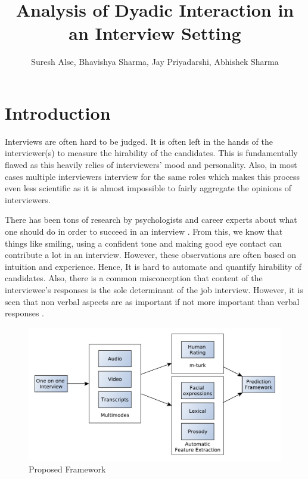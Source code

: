 \documentclass[11pt]{article}
\begin{document}
\title{Analysis of Dyadic Interaction in an Interview Setting}

\author{Suresh Alse, Bhavishya Sharma, Jay Priyadarshi, Abhishek Sharma}

\maketitle




\nocite{*}
\section{Introduction}
Interviews are often hard to be judged. It is often left in the hands of the interviewer(s) to measure the hirability of the candidates. This is fundamentally flawed as this heavily relies of interviewers' mood and personality. Also, in most cases multiple interviewers interview for the same roles which makes this process even less scientific as it is almost impossible to fairly aggregate the opinions of interviewers.

There has been tons of research by psychologists and career experts about what one should do in order to succeed in an interview \cite{huffcutt2001identification}. From this, we know that things like smiling, using a confident tone and making good eye contact can contribute a lot in an interview. However, these observations are often based on intuition and experience. Hence, It is hard to automate and quantify hirability of candidates. Also, there is a common misconception that content of the interviewee's responses is the sole determinant of the job interview. However, it is seen that non verbal aspects are as important if not more important than verbal responses \cite{mehrabian1971silent}.

\begin{figure}[h!]
\begin{center}
\includegraphics[width=0.7\columnwidth]{figures/process1/process1}
\caption{{Proposed Framework%
}}
\end{center}
\end{figure}
\end{document}
